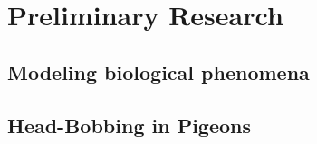 \section{Preliminary Research}
\subsection{Modeling biological phenomena}

\subsection{Head-Bobbing in Pigeons}


